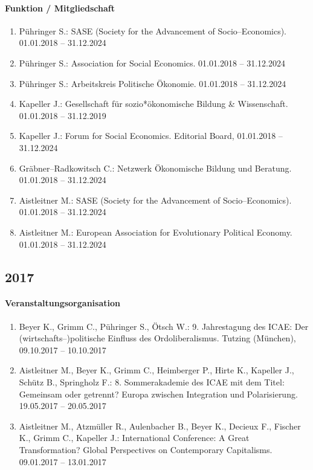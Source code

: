 \paragraph{Funktion / Mitgliedschaft}
\begin{enumerate}[leftmargin=*, labelsep=0.5cm]
\item Pühringer S.: SASE (Society for the Advancement of Socio--Economics). 01.01.2018 -- 31.12.2024
\item Pühringer S.: Association for Social Economics. 01.01.2018 -- 31.12.2024
\item Pühringer S.: Arbeitskreis Politische Ökonomie. 01.01.2018 -- 31.12.2024
\item Kapeller J.: Gesellschaft für sozio*ökonomische Bildung \& Wissenschaft. 01.01.2018 -- 31.12.2019
\item Kapeller J.: Forum for Social Economics. Editorial Board, 01.01.2018 -- 31.12.2024
\item Gräbner--Radkowitsch C.: Netzwerk Ökonomische Bildung und Beratung. 01.01.2018 -- 31.12.2024
\item Aistleitner M.: SASE (Society for the Advancement of Socio--Economics). 01.01.2018 -- 31.12.2024
\item Aistleitner M.: European Association for Evolutionary Political Economy. 01.01.2018 -- 31.12.2024
\end{enumerate}
\subsection*{2017}
\paragraph{Veranstaltungsorganisation}
\begin{enumerate}[leftmargin=*, labelsep=0.5cm]
\item Beyer K., Grimm C., Pühringer S., Ötsch W.: 9. Jahrestagung des ICAE: Der (wirtschafts--)politische Einfluss des Ordoliberalismus. Tutzing (München), 09.10.2017 -- 10.10.2017
\item Aistleitner M., Beyer K., Grimm C., Heimberger P., Hirte K., Kapeller J., Schütz B., Springholz F.: 8. Sommerakademie des ICAE mit dem Titel: Gemeinsam oder getrennt? Europa zwischen Integration und Polarisierung. 19.05.2017 -- 20.05.2017
\item Aistleitner M., Atzmüller R., Aulenbacher B., Beyer K., Decieux F., Fischer K., Grimm C., Kapeller J.: International Conference: A Great Transformation? Global Perspectives on Contemporary Capitalisms. 09.01.2017 -- 13.01.2017
\end{enumerate}

